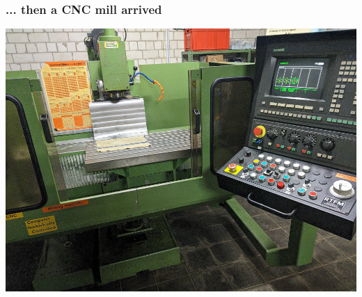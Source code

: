 \documentclass[aspectratio=169]{beamer}
\begin{document}
\begin{frame}
	\frametitle{... then a CNC mill arrived}

	\begin{center}
		\includegraphics[height=0.8\textheight]{cnc-mill.jpg}
	\end{center}

\end{frame}
\end{document}
